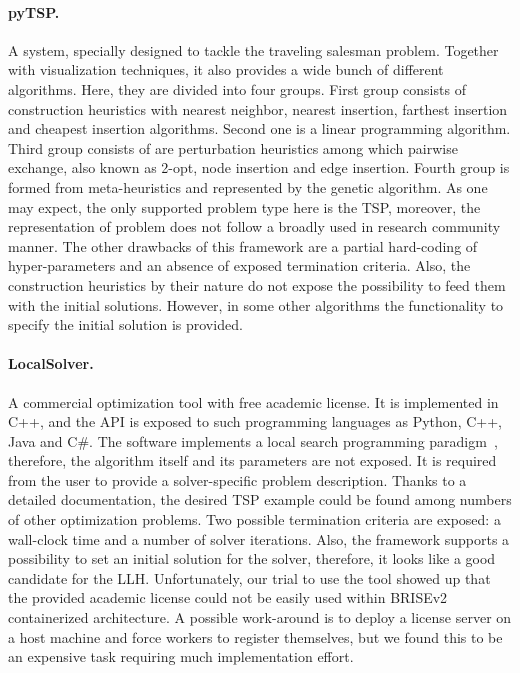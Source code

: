\paragraph{pyTSP.} A system, specially designed to tackle the traveling salesman problem. Together with visualization techniques, it also provides a wide bunch of different algorithms. Here, they are divided into four groups. First group consists of construction heuristics with nearest neighbor, nearest insertion, farthest insertion and cheapest insertion algorithms. Second one is a linear programming algorithm. Third group consists of are perturbation heuristics among which pairwise exchange, also known as 2-opt, node insertion and edge insertion. Fourth group is formed from meta-heuristics and represented by the genetic algorithm. As one may expect, the only supported problem type here is the TSP, moreover, the representation of problem does not follow a broadly used in research community manner. The other drawbacks of this framework are a partial hard-coding of hyper-parameters and an absence of exposed termination criteria. Also, the construction heuristics by their nature do not expose the possibility to feed them with the initial solutions. However, in some other algorithms the functionality to specify the initial solution is provided.

\paragraph{LocalSolver.} A commercial optimization tool with free academic license. It is implemented in C++, and the API is exposed to such programming languages as Python, C++, Java and C\#. The software implements a local search programming paradigm~\cite{benoist2010toward,benoist2011localsolver}, therefore, the algorithm itself and its parameters are not exposed. It is required from the user to provide a solver-specific problem description. Thanks to a detailed documentation, the desired TSP example could be found among numbers of other optimization problems. Two possible termination criteria are exposed: a wall-clock time and a number of solver iterations. Also, the framework supports a possibility to set an initial solution for the solver, therefore, it looks like a good candidate for the LLH. Unfortunately, our trial to use the tool showed up that the provided academic license could not be easily used within BRISEv2 containerized architecture. A possible work-around is to deploy a license server on a host machine and force workers to register themselves, but we found this to be an expensive task requiring much implementation effort.

